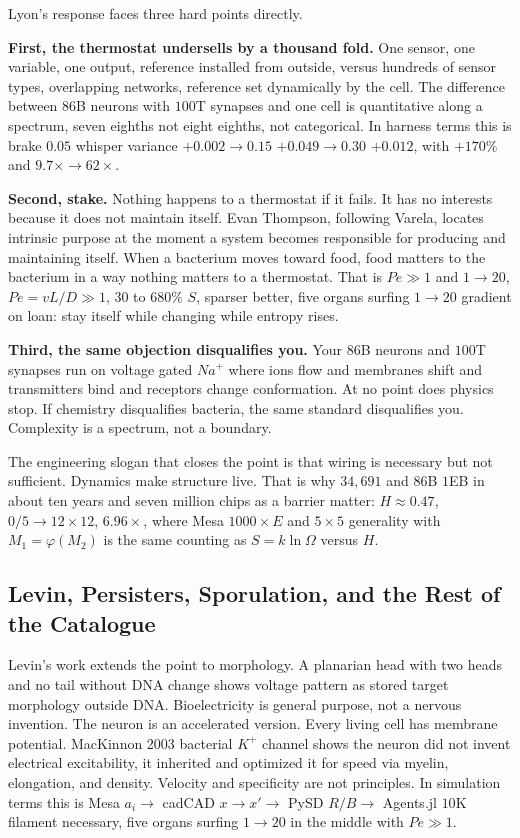 \documentclass[11pt,a4paper]{article}
\begin{document}
Lyon's response faces three hard points directly.

\textbf{First, the thermostat undersells by a thousand fold.} One sensor, one variable, one output, reference installed from outside, versus hundreds of sensor types, overlapping networks, reference set dynamically by the cell. The difference between $86$B neurons with $100$T synapses and one cell is quantitative along a spectrum, seven eighths not eight eighths, not categorical. In harness terms this is brake $0.05$ whisper variance $+0.002 \to 0.15$ $+0.049 \to 0.30$ $+0.012$, with $+170\%$ and $9.7\times \to 62\times$.

\textbf{Second, stake.} Nothing happens to a thermostat if it fails. It has no interests because it does not maintain itself. Evan Thompson, following Varela, locates intrinsic purpose at the moment a system becomes responsible for producing and maintaining itself. When a bacterium moves toward food, food matters to the bacterium in a way nothing matters to a thermostat. That is $Pe \gg 1$ and $1 \to 20$, $Pe = vL/D \gg 1$, $30$ to $680\%$ $S$, sparser better, five organs surfing $1 \to 20$ gradient on loan: stay itself while changing while entropy rises.

\textbf{Third, the same objection disqualifies you.} Your $86$B neurons and $100$T synapses run on voltage gated $Na^+$ where ions flow and membranes shift and transmitters bind and receptors change conformation. At no point does physics stop. If chemistry disqualifies bacteria, the same standard disqualifies you. Complexity is a spectrum, not a boundary.

The engineering slogan that closes the point is that wiring is necessary but not sufficient. Dynamics make structure live. That is why $34{,}691$ and $86$B $1$EB in about ten years and seven million chips as a barrier matter: $H \approx 0.47$, $0/5 \to 12 \times 12$, $6.96\times$, where Mesa $1000\times E$ and $5 \times 5$ generality with $M_1 = \varphi(M_2)$ is the same counting as $S = k \ln \Omega$ versus $H$.

\subsection{Levin, Persisters, Sporulation, and the Rest of the Catalogue}

Levin's work extends the point to morphology. A planarian head with two heads and no tail without DNA change shows voltage pattern as stored target morphology outside DNA. Bioelectricity is general purpose, not a nervous invention. The neuron is an accelerated version. Every living cell has membrane potential. MacKinnon 2003 bacterial $K^+$ channel shows the neuron did not invent electrical excitability, it inherited and optimized it for speed via myelin, elongation, and density. Velocity and specificity are not principles. In simulation terms this is Mesa $a_i \to$ cadCAD $x \to x' \to$ PySD $R/B \to$ Agents.jl $10$K filament necessary, five organs surfing $1 \to 20$ in the middle with $Pe \gg 1$.
\end{document}
